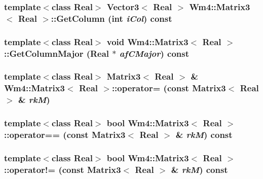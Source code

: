 \subsubsection{\setlength{\rightskip}{0pt plus 5cm}template$<$class Real$>$ {\bf Vector3}$<$ Real $>$ {\bf Wm4::Matrix3}$<$ Real $>$::Get\-Column (int {\em i\-Col}) const}\label{classWm4_1_1Matrix3_b9b4e634a1b143daabfe95ff3879db7f}


\subsubsection{\setlength{\rightskip}{0pt plus 5cm}template$<$class Real$>$ void {\bf Wm4::Matrix3}$<$ Real $>$::Get\-Column\-Major (Real $\ast$ {\em af\-CMajor}) const}\label{classWm4_1_1Matrix3_de35d2b6305ceab46e4e01dd0ad0db8f}


\subsubsection{\setlength{\rightskip}{0pt plus 5cm}template$<$class Real$>$ {\bf Matrix3}$<$ Real $>$ \& {\bf Wm4::Matrix3}$<$ Real $>$::operator= (const {\bf Matrix3}$<$ Real $>$ \& {\em rk\-M})\hspace{0.3cm}{\tt  [inline]}}\label{classWm4_1_1Matrix3_b651892db2baead2ac509b985b3d03c9}


\subsubsection{\setlength{\rightskip}{0pt plus 5cm}template$<$class Real$>$ bool {\bf Wm4::Matrix3}$<$ Real $>$::operator== (const {\bf Matrix3}$<$ Real $>$ \& {\em rk\-M}) const}\label{classWm4_1_1Matrix3_07b23c6e4d57bac29a9d84e7cf43c064}


\subsubsection{\setlength{\rightskip}{0pt plus 5cm}template$<$class Real$>$ bool {\bf Wm4::Matrix3}$<$ Real $>$::operator!= (const {\bf Matrix3}$<$ Real $>$ \& {\em rk\-M}) const}\label{classWm4_1_1Matrix3_fe3245dc5f4b44ae4f1b99678958fa35}


